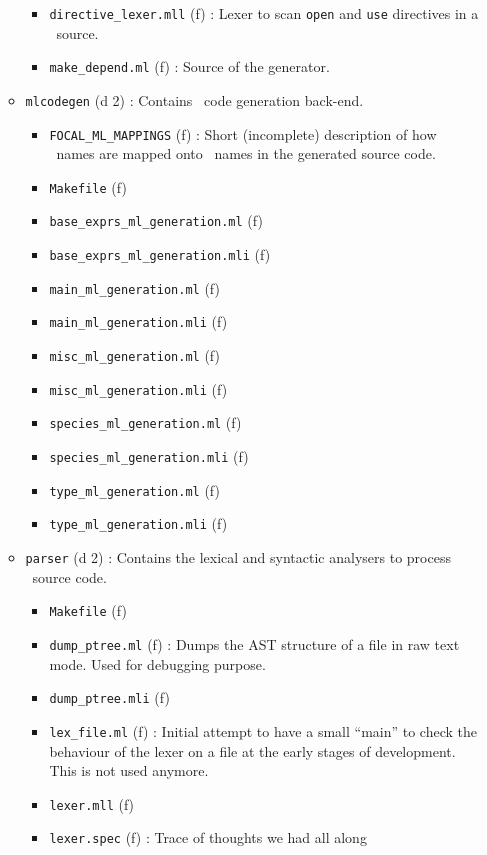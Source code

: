 \begin{itemize}
\begin{itemize}
\begin{itemize}
    \item {\tt directive\_lexer.mll} (f) : Lexer to scan {\tt open}
      and {\tt use} directives in a \focalize\ source.
    \item {\tt make\_depend.ml} (f) : Source of the generator.
    \end{itemize}
  \item {\tt mlcodegen} (d 2) : Contains \ocaml\ code generation back-end.
    \begin{itemize}
    \item {\tt FOCAL\_ML\_MAPPINGS} (f) : Short (incomplete) description
      of how \focalize\ names are mapped onto \ocaml\ names in the
      generated source code.
    \item {\tt Makefile} (f)
    \item {\tt base\_exprs\_ml\_generation.ml} (f)
    \item {\tt base\_exprs\_ml\_generation.mli} (f)
    \item {\tt main\_ml\_generation.ml} (f)
    \item {\tt main\_ml\_generation.mli} (f)
    \item {\tt misc\_ml\_generation.ml} (f)
    \item {\tt misc\_ml\_generation.mli} (f)
    \item {\tt species\_ml\_generation.ml} (f)
    \item {\tt species\_ml\_generation.mli} (f)
    \item {\tt type\_ml\_generation.ml} (f)
    \item {\tt type\_ml\_generation.mli} (f)
    \end{itemize}
  \item {\tt parser} (d 2) : Contains the lexical and syntactic
    analysers to process \focalize\ source code.
    \begin{itemize}
    \item {\tt Makefile} (f)
    \item {\tt dump\_ptree.ml} (f) : Dumps the AST structure of a file
      in raw text mode. Used for debugging purpose.
    \item {\tt dump\_ptree.mli} (f)
    \item {\tt lex\_file.ml} (f) : Initial attempt to have a small
      ``main'' to check the behaviour of the lexer on a file at the
      early stages of development. This is not used anymore.
    \item {\tt lexer.mll} (f)
    \item {\tt lexer.spec} (f) : Trace of thoughts we had all along

\end{itemize}
\end{itemize}
\end{itemize}
